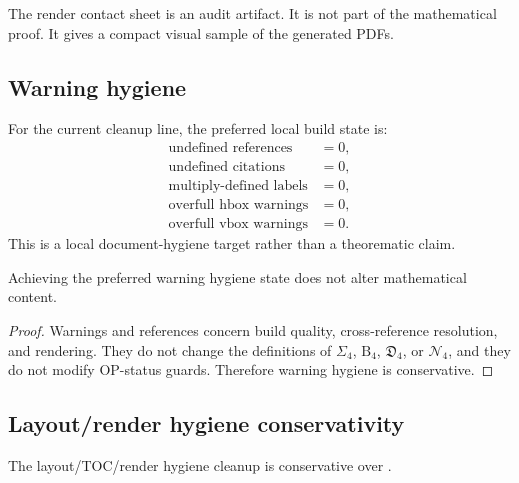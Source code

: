 \begin{remark}
\label{rem:v4012-contact-sheet-role}
The render contact sheet is an audit artifact. It is not part of the
mathematical proof. It gives a compact visual sample of the generated PDFs.
\end{remark}

\subsection{Warning hygiene}
\label{subsec:v4012-warning-hygiene}

\begin{definition}
\label{def:v4012-warning-hygiene-contract}
For the current cleanup line, the preferred local build state is:
\[
\begin{array}{ll}
\text{undefined references} & =0,\\
\text{undefined citations} & =0,\\
\text{multiply-defined labels} & =0,\\
\text{overfull hbox warnings} & =0,\\
\text{overfull vbox warnings} & =0.
\end{array}
\]
This is a local document-hygiene target rather than a theorematic claim.
\end{definition}

\begin{proposition}
\label{prop:v4012-warning-hygiene-conservative}
Achieving the preferred warning hygiene state does not alter mathematical
content.
\end{proposition}

\begin{proof}
Warnings and references concern build quality, cross-reference resolution, and
rendering. They do not change the definitions of $\Sigma_4$, $\mathrm B_4$,
$\mathfrak D_4$, or $\mathcal N_4$, and they do not modify OP-status guards.
Therefore warning hygiene is conservative.
\end{proof}

\subsection{Layout/render hygiene conservativity}
\label{subsec:v4012-layout-render-hygiene-conservativity}

\begin{theorem}
\label{thm:v4012-layout-toc-render-hygiene-conservativity}
The  layout/TOC/render hygiene cleanup is conservative over .
\end{theorem}


